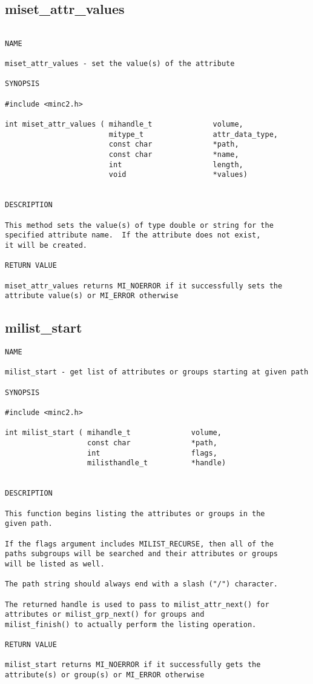 \documentclass{article}
\begin{document}
\subsection{miset\_attr\_values}

\begin{verbatim}

NAME 

miset_attr_values - set the value(s) of the attribute

SYNOPSIS

#include <minc2.h>

int miset_attr_values ( mihandle_t              volume,
                        mitype_t                attr_data_type,
                        const char              *path,
                        const char              *name,
                        int                     length,
                        void                    *values)
                       
                                
DESCRIPTION

This method sets the value(s) of type double or string for the 
specified attribute name.  If the attribute does not exist, 
it will be created.

RETURN VALUE

miset_attr_values returns MI_NOERROR if it successfully sets the
attribute value(s) or MI_ERROR otherwise
\end{verbatim}

\subsection{milist\_start}

\begin{verbatim}
NAME 

milist_start - get list of attributes or groups starting at given path

SYNOPSIS

#include <minc2.h>

int milist_start ( mihandle_t              volume, 
                   const char              *path,
                   int                     flags,
                   milisthandle_t          *handle)

                                                
DESCRIPTION

This function begins listing the attributes or groups in the 
given path.

If the flags argument includes MILIST_RECURSE, then all of the 
paths subgroups will be searched and their attributes or groups 
will be listed as well.

The path string should always end with a slash ("/") character.

The returned handle is used to pass to milist_attr_next() for 
attributes or milist_grp_next() for groups and 
milist_finish() to actually perform the listing operation.

RETURN VALUE

milist_start returns MI_NOERROR if it successfully gets the
attribute(s) or group(s) or MI_ERROR otherwise

\end{verbatim}
\end{document}
